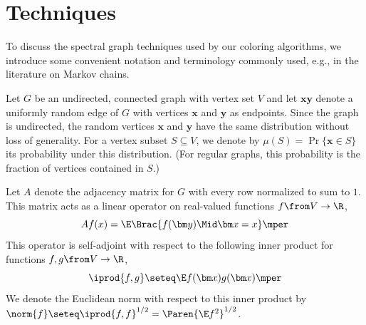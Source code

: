 \section{Techniques}
\label{sec:techniques}





To discuss the spectral graph techniques used by our coloring algorithms,
we introduce some convenient notation and terminology commonly used, e.g., in the literature on Markov chains.

Let \(G\) be an undirected, connected graph with vertex set \(V\) and let \(\bm x \bm y\) denote a uniformly random edge of \(G\) with vertices \(\bm x\) and \(\bm y\) as endpoints.
Since the graph is undirected, the random vertices \(\bm x\) and \(\bm y\) have the same distribution without loss of generality.
For a vertex subset \(S\subseteq V\), we denote by \(\mu(S)=\Pr\{\bm x\in S\}\) its probability under this distribution.
(For regular graphs, this probability is the fraction of vertices contained in \(S\).)

Let \(A\) denote the adjacency matrix for \(G\) with every row normalized to sum to \(1\).
This matrix acts as a linear operator on real-valued functions \(f\from V\to \R\),
\begin{equation}
  A f (x)
  = \E \Brac{f(\bm y) \Mid \bm x = x}
  \mper
\end{equation}
This operator is self-adjoint with respect to the following inner product for functions \(f,g\from V\to \R\),
\begin{equation}
  \iprod{f,g}
  \seteq \E f(\bm x) g(\bm x)\mper
\end{equation}
We denote the Euclidean norm with respect to this inner product by \(\norm{f}\seteq \iprod{f,f}^{1/2}=\Paren{\E f^{2}}^{1/2}\).

